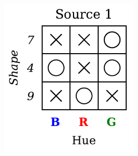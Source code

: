 \begin{definition}
\begin{figure}[H]
        \begin{subfigure}[b]{0.45\textwidth}
            \centering
            \begin{subfigure}[b]{0.48\textwidth}
                \centering
                \includegraphics[width=\textwidth]{img/datasets/2-CGO_fact=hue_env=0.pdf}
            \end{subfigure}
            \begin{subfigure}[b]{0.48\textwidth}
                \centering

\end{subfigure}
\end{subfigure}
\end{figure}
\end{definition}
